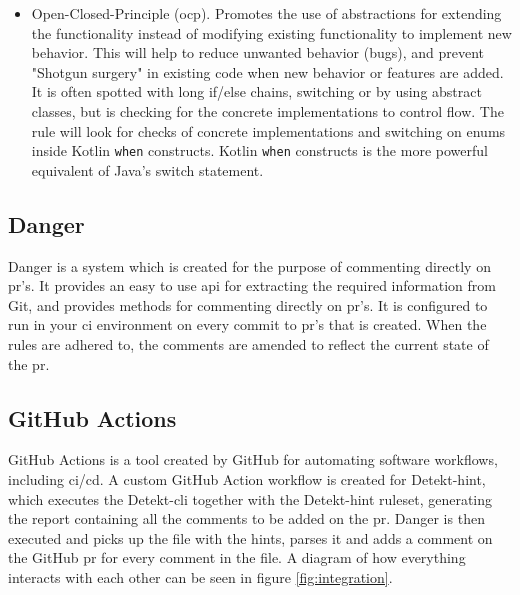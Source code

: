 \documentclass{report}
\begin{document}
\begin{itemize}
    \item Open-Closed-Principle (\gls{ocp}). Promotes the use of abstractions for extending the functionality instead of modifying existing functionality to implement new behavior. This will help to reduce unwanted behavior (bugs), and prevent "Shotgun surgery" in existing code when new behavior or features are added. It is often spotted with long if/else chains, switching or by using abstract classes, but is checking for the concrete implementations to control flow\cite{ocp3}. The rule will look for checks of concrete implementations and switching on enums inside Kotlin \texttt{when} constructs. Kotlin \texttt{when} constructs is the more powerful equivalent of Java's switch statement.
\end{itemize}


\subsection{Danger}
Danger is a system which is created for the purpose of commenting directly on \gls{pr}'s. It provides an easy to use \gls{api} for extracting the required information from Git, and provides methods for commenting directly on \gls{pr}'s. It is configured to run in your \gls{ci} environment on every commit to \gls{pr}'s that is created. When the rules are adhered to, the comments are amended to reflect the current state of the \gls{pr}. 

\subsection{GitHub Actions}
GitHub Actions is a tool created by GitHub for automating software workflows, including \gls{ci}/\gls{cd}. A custom GitHub Action workflow is created for Detekt-hint, which executes the Detekt-\gls{cli} together with the Detekt-hint ruleset, generating the report containing all the comments to be added on the \gls{pr}. Danger is then executed and picks up the file with the hints, parses it and adds a comment on the GitHub \gls{pr} for every comment in the file. A diagram of how everything interacts with each other can be seen in figure \ref{fig:integration}. 
\end{document}
